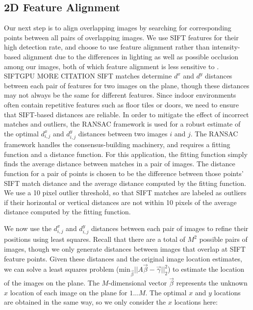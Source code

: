 \documentclass[]{spie}  %
\begin{document}
\subsection{2D Feature Alignment}
\label{sec:robustSIFTFeatureMatching}
Our next step is to align overlapping images by searching for
corresponding points between all pairs of overlapping images. We use
SIFT features for their high detection rate, and choose to use feature
alignment rather than intensity-based alignment due to the differences
in lighting as well as possible occlusion among our images, both of
which feature alignment is less sensitive to \cite{lai1999robust,
  lowe1999object, mikolajczyk2005performance, szeliski2006image}.
SIFTGPU MORE CITATION SIFT matches determine $d^x$ and $d^y$ distances
between each pair of features for two images on the plane, though
these distances may not always be the same for different
features. Since indoor environments often contain repetitive features
such as floor tiles or doors, we need to ensure that SIFT-based
distances are reliable. In order to mitigate the effect of incorrect
matches and outliers, the RANSAC framework \cite{fischler1981random}
is used for a robust estimate of the optimal $d^x_{i,j}$ and
$d^y_{i,j}$ distances between two images $i$ and $j$. The RANSAC
framework handles the consensus-building machinery, and requires a
fitting function and a distance function. For this application, the
fitting function simply finds the average distance between matches in
a pair of images. The distance function for a pair of points is chosen
to be the difference between those points' SIFT match distance and the
average distance computed by the fitting function. We use a 10 pixel
outlier threshold, so that SIFT matches are labeled as outliers if
their horizontal or vertical distances are not within 10 pixels of the
average distance computed by the fitting function.

We now use the $d^x_{i,j}$ and $d^y_{i,j}$ distances between each pair
of images to refine their positions using least squares. Recall that
there are a total of $M^{2}$ possible pairs of images, though we only
generate distances between images that overlap at SIFT feature
points. Given these distances and the original image location
estimates, we can solve a least squares problem
($\textrm{min}_{\vec{\beta}} ||A \vec{\beta} - \vec{\gamma}||_2^2 $)
to estimate the location of the images on the plane. The
$M$-dimensional vector $\vec{\beta}$ represents the unknown $x$
location of each image on the plane for $1 \dots M$. The optimal $x$
and $y$ locations are obtained in the same way, so we only consider
the $x$ locations here:
\end{document}
